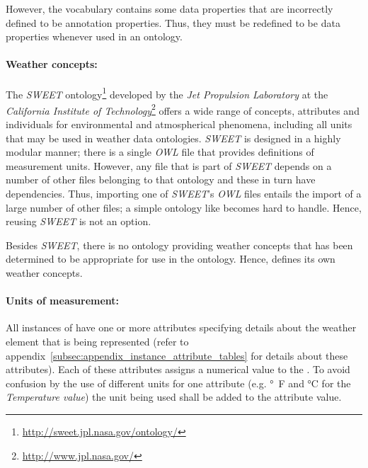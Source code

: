 However, the vocabulary contains some data properties that are incorrectly defined to be annotation properties. Thus, they must be redefined to be data properties whenever used in an ontology.

\paragraph{Weather concepts:}

The \emph{SWEET} ontology\cite{SWEET}\footnote{\href{http://sweet.jpl.nasa.gov/ontology/}{http://sweet.jpl.nasa.gov/ontology/}} developed by the \emph{Jet Propulsion Laboratory} at the \emph{California Institute of Technology}\footnote{\href{http://www.jpl.nasa.gov/}{http://www.jpl.nasa.gov/}} offers a wide range of concepts, attributes and individuals for environmental and atmospherical phenomena, including all units that may be used in weather data ontologies. \emph{SWEET} is designed in a highly modular manner; there is a single \emph{OWL} file that provides definitions of measurement units. However, any file that is part of \emph{SWEET} depends on a number of other files belonging to that ontology and these in turn have dependencies. Thus, importing one of \emph{SWEET}'s \emph{OWL} files entails the import of a large number of other files; a simple ontology like \thinkhomeweather becomes hard to handle. Hence, reusing \emph{SWEET} is not an option.

Besides \emph{SWEET}, there is no ontology providing weather concepts that has been determined to be appropriate for use in the \thinkhomeweather ontology. Hence, \thinkhomeweather defines its own weather concepts.

\paragraph{Units of measurement:}

\newcommand{\muo}{\emph{MUO}\xspace}

All instances of  have one or more attributes specifying details about the weather element that is being represented (refer to appendix~\ref{subsec:appendix_instance_attribute_tables} for details about these attributes). Each of these attributes assigns a numerical value to the . To avoid confusion by the use of different units for one attribute (e.g. \si{\degree F} and \si{\celsius} for the \emph{Temperature value}) the unit being used shall be added to the attribute value.

